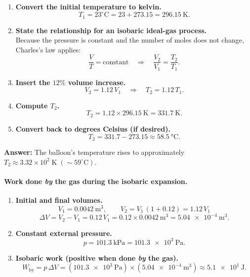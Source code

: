 \documentclass[12pt]{article}
\theoremstyle{definition} %
\theoremstyle{plain} %
\begin{document}
\begin{enumerate}
  \item \textbf{Convert the initial temperature to kelvin.}
        \[
          T_1 = 23^{\circ}\mathrm{C}
          = 23 + 273.15
          = \SI{296.15}{\kelvin}.
        \]

  \item \textbf{State the relationship for an isobaric ideal-gas process.}\\
        Because the pressure is constant and the number of moles does not
        change, Charles’s law applies:
        \[
          \frac{V}{T} = \text{constant}
          \quad\Longrightarrow\quad
          \frac{V_2}{V_1} = \frac{T_2}{T_1}.
        \]

  \item \textbf{Insert the \(12\%\) volume increase.}
        \[
          V_2 = 1.12\,V_1
          \quad\Longrightarrow\quad
          T_2 = 1.12\,T_1.
        \]

  \item \textbf{Compute \(T_2\).}
        \[
          T_2
          = 1.12 \times \SI{296.15}{\kelvin}
          = \SI{331.7}{\kelvin}.
        \]

  \item \textbf{Convert back to degrees Celsius (if desired).}
        \[
          T_2
          = 331.7 - 273.15
          \approx \boxed{\SI{58.5}{\celsius}}.
        \]
\end{enumerate}

\noindent
\textbf{Answer:} The balloon’s temperature rises to approximately
\(\boxed{T_2 \approx 3.32\times 10^{2}\;\text{K} \;(\sim\!59^{\circ}\text{C})}\).
\paragraph{Work done \emph{by} the gas during the isobaric expansion.}

\begin{enumerate}
  \item \textbf{Initial and final volumes.}
        \[
          V_1 = \SI{0.0042}{\meter^{3}}, 
          \qquad
          V_2 = V_1 \,(1+0.12) = 1.12\,V_1
        \]
        \[
          \Delta V = V_2 - V_1 = 0.12\,V_1
                   = 0.12 \times \SI{0.0042}{\meter^{3}}
                   = \SI{5.04e-4}{\meter^{3}}.
        \]

  \item \textbf{Constant external pressure.}
        \[
          p = \SI{101.3}{\kilo\pascal} = \SI{101.3e3}{\pascal}.
        \]

  \item \textbf{Isobaric work (positive when done \emph{by} the gas).}
        \[
          W_{\text{by}} = p\,\Delta V
          = (\SI{101.3e3}{\pascal}) \times (\SI{5.04e-4}{\meter^{3}})
          \approx \SI{5.1e1}{\joule}.
        \]
\end{enumerate}
\end{document}
